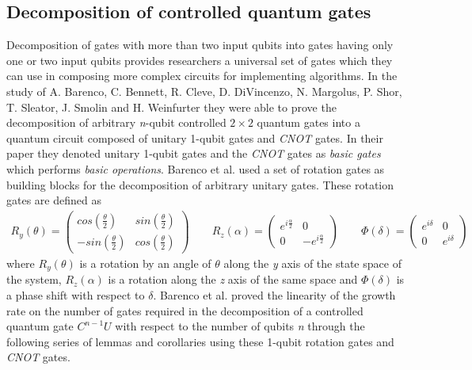 \subsection{Decomposition of controlled quantum gates}
Decomposition of gates with more than two input qubits into gates having only one or two input qubits provides researchers a universal set of gates which they can use in composing more complex circuits for implementing algorithms. In the study of A. Barenco, C. Bennett, R. Cleve, D. DiVincenzo, N. Margolus, P. Shor, T. Sleator, J. Smolin and H. Weinfurter \cite{Barenco1995} they were able to prove the decomposition of arbitrary \textit{n}-qubit controlled $2\times 2$ quantum gates into a quantum circuit composed of unitary 1-qubit gates and \textit{CNOT} gates. In their paper they denoted unitary 1-qubit gates and the \textit{CNOT} gates as \textit{basic gates} which performs \textit{basic operations}. Barenco et al. used a set of rotation gates as building blocks for the decomposition of arbitrary unitary gates. These rotation gates are defined as
\begin{align*}
R_y(\theta)=
\begin{pmatrix}
cos(\frac{\theta}{2}) & sin(\frac{\theta}{2})\\
-sin(\frac{\theta}{2}) & cos(\frac{\theta}{2})
\end{pmatrix}
\qquad
R_z(\alpha)=
\begin{pmatrix}
e^{i\frac{\alpha}{2}} & 0\\
0 & -e^{i\frac{\alpha}{2}}
\end{pmatrix}
\qquad
\Phi(\delta)=
\begin{pmatrix}
e^{i\delta} & 0\\
0 & e^{i\delta}
\end{pmatrix}
\end{align*}
where $R_y(\theta)$ is a rotation by an angle of $\theta$ along the \textit{y} axis of the state space of the system, $R_z(\alpha)$ is a rotation along the \textit{z} axis of the same space and $\Phi(\delta)$ is a phase shift with respect to $\delta$. Barenco et al. proved the linearity of the growth rate on the number of gates required in the decomposition of a controlled quantum gate $C^{n-1}U$ with respect to the number of qubits \textit{n} through the following series of lemmas and corollaries using these 1-qubit rotation gates and \textit{CNOT} gates.

